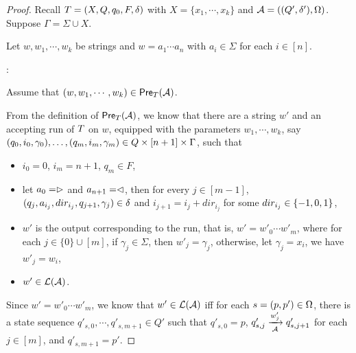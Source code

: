 \begin{proof}
Recall $T = (X, Q, q_0, F, \delta)$ with $X= \{x_1,\cdots, x_k\}$ and $\mathcal{A} =( (Q', \delta'), \Omega)$. 
Suppose $\Gamma = \Sigma \cup X$. 

Let $w, w_1, \cdots, w_k$ be strings and $w = a_1 \cdots a_n$ with $a_i \in \Sigma$ for each $i \in [n]$.

\smallskip

: 

\smallskip

Assume that $(w, w_1,\cdots, w_k) \in \textsf{Pre}_{T}(\mathcal{A})$.


From the definition of $\textsf{Pre}_{T}(\mathcal{A})$, we know that there are a string $w' $ and an accepting run of $T$ on $w$, equipped with the parameters $w_1,\cdots, w_k$, say $(q_0, i_0, \gamma_0),\ldots, (q_m, i_m, \gamma_m) \in Q \times [n+1] \times \Gamma$, such that 
%
\begin{itemize}
\item $i_0=0$, $i_m = n+1$, $q_m \in F$,
%
\item let $a_0 = \vartriangleright$ and $a_{n+1} = \vartriangleleft$,  then for every $j \in [m-1]$, $(q_j, a_{i_j}, dir_{i_j}, q_{j+1}, \gamma_j) \in
        \delta$ and $i_{j+1} = i_j + dir_{i_j}$ for some $dir_{i_j} \in \{-1, 0, 1\}$, 
 \item $w'$ is the output corresponding to the run, that is, $ w' = w'_0 \cdots w'_m$, where for each $j \in \{0\} \cup [m]$, if $\gamma_j \in \Sigma$, then $w'_j = \gamma_j$, otherwise, let $\gamma_j = x_i$, we have $w'_j = w_i$,
 \item  $w' \in \mathcal{L}(\mathcal{A})$.
\end{itemize}

Since $ w' = w'_0 \cdots w'_m$, we know that $w' \in \mathcal{L}(\mathcal{A})$ iff for each $s=(p, p') \in \Omega$, there is a state sequence $q'_{s,0}, \cdots, q'_{s,m+1} \in Q'$ such that  $q'_{s,0}= p$, $q'_{s,j} \xrightarrow[\mathcal{A}]{w'_j} q'_{s, j+1}$ for each $j \in [m]$,  and $q'_{s, m+1} = p'$.


\end{proof}
